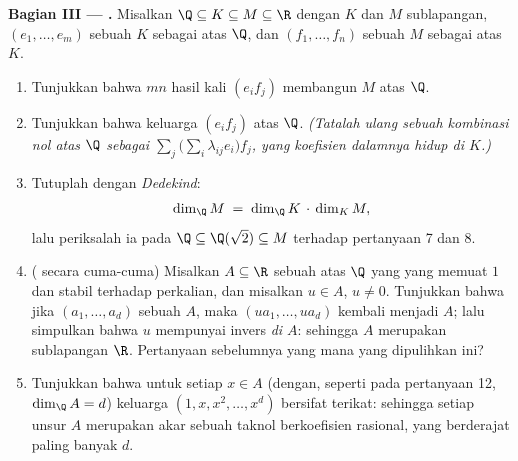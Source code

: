 \begin{problem}
\medskip
\noindent\textbf{Bagian III --- .} Misalkan $\Q \subseteq K
\subseteq M \subseteq \R$ dengan $K$ dan $M$ sublapangan, $(e_1,
\dots, e_m)$ sebuah  $K$ sebagai  atas $\Q$, dan $(f_1,
\dots, f_n)$ sebuah  $M$ sebagai  atas $K$.
\begin{enumerate}[resume]
  \item Tunjukkan bahwa $mn$ hasil kali $(e_i f_j)$ membangun $M$ atas
        $\Q$.
  \item Tunjukkan bahwa keluarga $(e_i f_j)$  atas $\Q$.
        \emph{(Tatalah ulang sebuah kombinasi nol atas $\Q$ sebagai $\sum_j
        \bigl(\sum_i \lambda_{ij} e_i\bigr) f_j$, yang koefisien
        dalamnya hidup di $K$.)}
  \item Tutuplah dengan \emph{ Dedekind}:
        \[
        \dim_\Q M \;=\; \dim_\Q K \,\cdot\, \dim_K M ,
        \]
        lalu periksalah ia pada $\Q \subseteq \Q(\sqrt2) \subseteq M$
        terhadap pertanyaan 7 dan 8.
  \item ( secara cuma-cuma) Misalkan $A \subseteq \R$ sebuah
         atas $\Q$ yang  yang memuat $1$ dan
        stabil terhadap perkalian, dan misalkan $u \in A$, $u \neq
        0$. Tunjukkan bahwa jika $(a_1, \dots, a_d)$ sebuah  $A$,
        maka $(u a_1, \dots, u a_d)$ kembali menjadi  $A$;
        lalu simpulkan bahwa $u$ mempunyai invers \emph{di $A$}: sehingga $A$ merupakan
        sublapangan $\R$. Pertanyaan sebelumnya yang mana yang dipulihkan ini?
  \item Tunjukkan bahwa untuk setiap $x \in A$ (dengan, seperti pada pertanyaan 12, $\dim_\Q
        A = d$) keluarga $(1, x, x^2, \dots, x^{d})$ bersifat terikat:
        sehingga setiap unsur $A$ merupakan akar sebuah  taknol
        berkoefisien rasional, yang berderajat paling banyak $d$.
\end{enumerate}


\end{problem}
